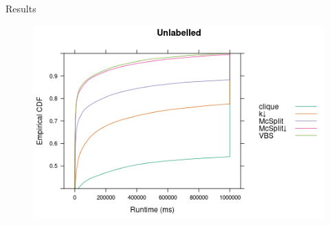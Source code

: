 \documentclass{beamer}
\begin{document}


\begin{frame}{Results}
  \begin{figure}
    \centering
    \includegraphics[width=\textwidth]{../dissertation/images/ecdf_unlabelled.png}
  \end{figure}
\end{frame}
\end{document}
